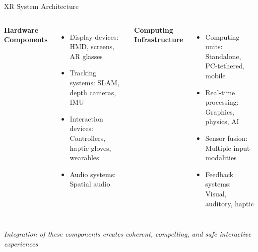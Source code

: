

\begin{frame}{XR System Architecture}
	\begin{columns}[t]
		\textbf{Hardware Components}
		
		\begin{itemize}
			\item Display devices: HMD, screens, AR glasses
			\item Tracking systems: SLAM, depth cameras, IMU
			\item Interaction devices: Controllers, haptic gloves, wearables
			\item Audio systems: Spatial audio
		\end{itemize}
		
		\textbf{Computing Infrastructure}
		
		\begin{itemize}
			\item Computing units: Standalone, PC-tethered, mobile
			\item Real-time processing: Graphics, physics, AI
			\item Sensor fusion: Multiple input modalities
			\item Feedback systems: Visual, auditory, haptic
		\end{itemize}
	\end{columns}
	
	\vspace{0.3cm}
	
	\begin{center}
		\small \textit{Integration of these components creates coherent, compelling, and safe interactive experiences}
	\end{center}
\end{frame}




